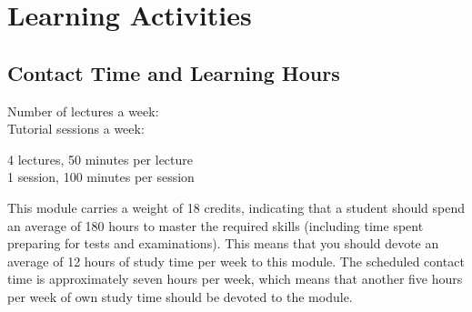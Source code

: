 \section{Learning Activities}
    \subsection{Contact Time and Learning Hours}
        \begin{minipage}{0.4\linewidth}
            Number of lectures a week: \\
            Tutorial sessions a week:
        \end{minipage}
        \begin{minipage}{0.4\linewidth}
            4 lectures, 50 minutes per lecture \\
            1 session, 100 minutes per session
        \end{minipage}

        This module carries a weight of 18 credits, indicating that a student
        should spend an average of 180 hours to master the required skills 
        (including time spent preparing for tests and examinations). This means
        that you should devote an average of 12 hours of study time per week to
        this module. The scheduled contact time is approximately seven hours per
        week, which means that another five hours per week of own study time
        should be devoted to the module.
    
